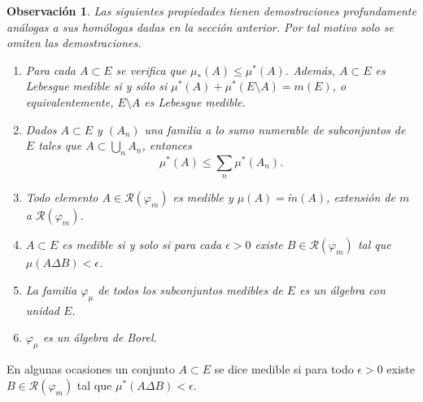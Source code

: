 \documentclass[twoside,12pt,a4 paper,openright]{book}
\newtheorem{ob}[claim]{Observaci\'on}
\begin{document}
 

\begin{ob}
    
     
Las siguientes propiedades tienen demostraciones  profundamente   an\'alogas a sus hom\'ologas dadas en la secci\'on anterior. Por tal motivo solo se omiten las demostraciones.
     \begin{enumerate}
     
\item Para cada $A\subset E$ se verifica que  $\mu_*(A)\leq \mu^*(A)$. Adem\'as, $A\subset E$ es Lebesgue medible si y s\'olo si $\mu^*(A) + \mu^*(E\setminus A) = m(E)$, o equivalentemente,  $E\setminus A$  es  Lebesgue medible. 
        \item Dados $A\subset E$ y $(A_n)$ una familia a lo sumo numerable de subconjuntos de $E$ tales que $A\subset \bigcup_n A_n$, entonces
         $$\mu^*(A) \leq \sum_n \mu^*(A_n).$$

         \item Todo elemento $A\in \mathcal{R}(\varphi_m)$ es medible y $\mu(A) = \tilde{m}(A)$, extensi\'on de $m$ a $\mathcal{R}(\varphi_m)$.

         \item $A\subset E$ es medible si y solo si para cada $\epsilon>0$ existe $B\in \mathcal{R}(\varphi_m)$ tal que $\mu(A\Delta B) < \epsilon$.

         \item La familia $\varphi_\mu$ de todos los subconjuntos medibles de $E$  es un \'algebra con unidad $E$.

         \item $\varphi_\mu$ es un \'algebra de Borel.


    \end{enumerate}
\end{ob}


En algunas ocasiones  un conjunto $A\subset E$ se dice medible   si para todo $ \epsilon > 0$ existe $B\in \mathcal{R}(\varphi_m)$ tal que $\mu^*(A\Delta B)<\epsilon$.
\end{document}
